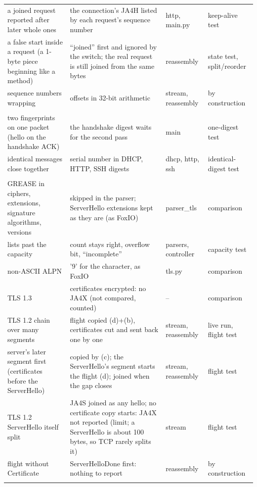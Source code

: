 {\begin{longtable}{>{\raggedright\arraybackslash}p{36mm} >{\raggedright\arraybackslash}p{70mm} >{\raggedright\arraybackslash}p{22mm} >{\raggedright\arraybackslash}p{24mm}}
a joined request reported after later whole ones & the connection's JA4H listed by each request's sequence number & http, main.py & keep-alive test \\
a false start inside a request (a 1-byte piece beginning like a method) & ``joined'' first and ignored by the switch; the real request is still joined from the same bytes & reassembly & state test, split/reorder \\
sequence numbers wrapping & offsets in 32-bit arithmetic & stream, reassembly & by construction \\
\midrule
\multicolumn{4}{l}{\textit{Digests}} \\[2pt]
two fingerprints on one packet (hello on the handshake ACK) & the handshake digest waits for the second pass & main & one-digest test \\
identical messages close together & serial number in DHCP, HTTP, SSH digests & dhcp, http, ssh & identical-digest test \\
\midrule
\multicolumn{4}{l}{\textit{TLS}} \\[2pt]
GREASE in ciphers, extensions, signature algorithms, versions & skipped in the parser; ServerHello extensions kept as they are (as FoxIO) & parser\_tls & comparison \\
lists past the capacity & count stays right, overflow bit, ``incomplete'' & parsers, controller & capacity test \\
non-ASCII ALPN & '9' for the character, as FoxIO & tls.py & comparison \\
TLS 1.3 & certificates encrypted: no JA4X (not compared, counted) & -- & comparison \\
TLS 1.2 chain over many segments & flight copied (d)+(b), certificates cut and sent back one by one & stream, reassembly & live run, flight test \\
server's later segment first (certificates before the ServerHello) & copied by (c); the ServerHello's segment starts the flight (d); joined when the gap closes & stream, reassembly & flight test \\
TLS 1.2 ServerHello itself split & JA4S joined as any hello; no certificate copy starts: JA4X not reported (limit; a ServerHello is about 100 bytes, so TCP rarely splits it) & stream & flight test \\
flight without Certificate & ServerHelloDone first: nothing to report & reassembly & by construction \\
\midrule
\multicolumn{4}{l}{\textit{TCP and IP}} \\[2pt]

\end{longtable}}
